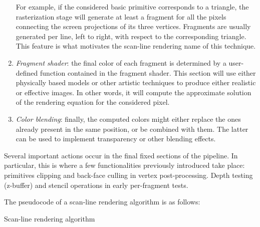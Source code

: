 \begin{enumerate}
        For example, if the considered basic primitive corresponds to a triangle, the rasterization stage will generate at least a fragment for all the pixels connecting the screen projections of its three vertices. 
        Fragments are usually generated per line, left to right, with respect to the corresponding triangle. 
        This feature is what motivates the scan-line rendering name of this technique.
    \item \textit{Fragment shader}: the final color of each fragment is determined by a user-defined function contained in the fragment shader. 
        This section will use either physically based models or other artistic techniques to produce either realistic or effective images. 
        In other words, it will compute the approximate solution of the rendering equation for the considered pixel.
    \item \textit{Color blending}: finally, the computed colors might either replace the ones already present in the same position, or be combined with them. 
        The latter can be used to implement transparency or other blending effects.
\end{enumerate}

Several important actions occur in the final fixed sections of the pipeline. 
In particular, this is where a few functionalities previously introduced take place: primitives clipping and back-face culling in vertex post-processing. 
Depth testing (z-buffer) and stencil operations in early per-fragment tests.

The pseudocode of a scan-line rendering algorithm is as follows:
\begin{algorithm}[H]
    \caption{Scan-line rendering algorithm}
        \begin{algorithmic}[1]
                            \EndFor{}
                        \EndIf{}
                    \EndFor{}
                \EndFor{}
            \EndFor{}
        \end{algorithmic}
\end{algorithm}

